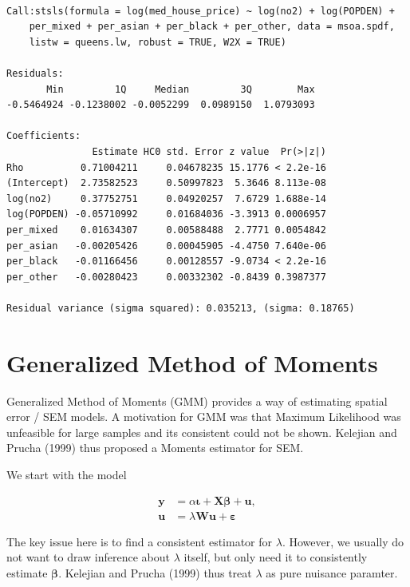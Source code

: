 \documentclass[
  letterpaper,
  DIV=11,
  numbers=noendperiod]{scrreprt}
\begin{document}
\begin{verbatim}

Call:stsls(formula = log(med_house_price) ~ log(no2) + log(POPDEN) + 
    per_mixed + per_asian + per_black + per_other, data = msoa.spdf, 
    listw = queens.lw, robust = TRUE, W2X = TRUE)

Residuals:
       Min         1Q     Median         3Q        Max 
-0.5464924 -0.1238002 -0.0052299  0.0989150  1.0793093 

Coefficients: 
               Estimate HC0 std. Error z value  Pr(>|z|)
Rho          0.71004211     0.04678235 15.1776 < 2.2e-16
(Intercept)  2.73582523     0.50997823  5.3646 8.113e-08
log(no2)     0.37752751     0.04920257  7.6729 1.688e-14
log(POPDEN) -0.05710992     0.01684036 -3.3913 0.0006957
per_mixed    0.01634307     0.00588488  2.7771 0.0054842
per_asian   -0.00205426     0.00045905 -4.4750 7.640e-06
per_black   -0.01166456     0.00128557 -9.0734 < 2.2e-16
per_other   -0.00280423     0.00332302 -0.8439 0.3987377

Residual variance (sigma squared): 0.035213, (sigma: 0.18765)
\end{verbatim}

\hypertarget{generalized-method-of-moments}{%
\section{Generalized Method of
Moments}\label{generalized-method-of-moments}}

Generalized Method of Moments (GMM) provides a way of estimating spatial
error / SEM models. A motivation for GMM was that Maximum Likelihood was
unfeasible for large samples and its consistent could not be shown.
Kelejian and Prucha (1999) thus proposed a Moments estimator for SEM.

We start with the model

\[
        \begin{equation} 
        \begin{split}
        {\boldsymbol{\mathbf{y}}}&=\alpha{\boldsymbol{\mathbf{\iota}}}+{\boldsymbol{\mathbf{X}}}{\boldsymbol{\mathbf{\beta}}}+{\boldsymbol{\mathbf{u}}},\\
        {\boldsymbol{\mathbf{u}}}&=\lambda{\boldsymbol{\mathbf{W}}}{\boldsymbol{\mathbf{u}}}+{\boldsymbol{\mathbf{\varepsilon}}}
        \end{split} 
        \end{equation}
\]

The key issue here is to find a consistent estimator for \(\lambda\).
However, we usually do not want to draw inference about \(\lambda\)
itself, but only need it to consistently estimate
\(\boldsymbol{\mathbf{\beta}}\). Kelejian and Prucha (1999) thus treat
\(\lambda\) as pure nuisance paramter.
\end{document}
